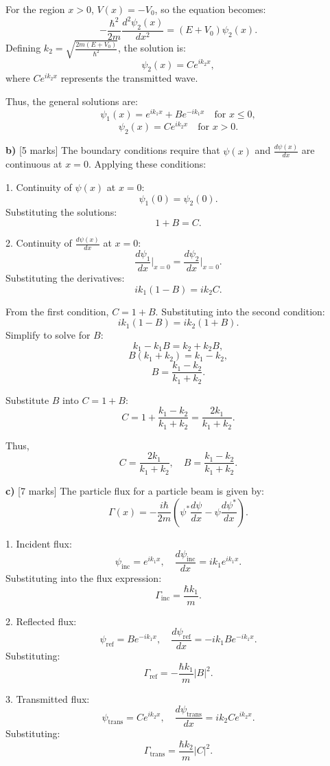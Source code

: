For the region $x > 0$, $V(x) = -V_0$, so the equation becomes:  
\[
-\frac{\hbar^2}{2m} \frac{d^2 \psi_2(x)}{dx^2} = (E + V_0)\psi_2(x).
\]  
Defining $k_2 = \sqrt{\frac{2m(E+V_0)}{\hbar^2}}$, the solution is:  
\[
\psi_2(x) = Ce^{ik_2x},
\]  
where $Ce^{ik_2x}$ represents the transmitted wave.  

Thus, the general solutions are:  
\[
\psi_1(x) = e^{ik_1x} + Be^{-ik_1x} \quad \text{for } x \leq 0,
\]  
\[
\psi_2(x) = Ce^{ik_2x} \quad \text{for } x > 0.
\]  

\textbf{b)} [5 marks]  
The boundary conditions require that $\psi(x)$ and $\frac{d\psi(x)}{dx}$ are continuous at $x = 0$. Applying these conditions:  

1. Continuity of $\psi(x)$ at $x = 0$:  
\[
\psi_1(0) = \psi_2(0).
\]  
Substituting the solutions:  
\[
1 + B = C.
\]  

2. Continuity of $\frac{d\psi(x)}{dx}$ at $x = 0$:  
\[
\frac{d\psi_1}{dx}\Big|_{x=0} = \frac{d\psi_2}{dx}\Big|_{x=0}.
\]  
Substituting the derivatives:  
\[
ik_1(1 - B) = ik_2C.
\]  

From the first condition, $C = 1 + B$. Substituting into the second condition:  
\[
ik_1(1 - B) = ik_2(1 + B).
\]  
Simplify to solve for $B$:  
\[
k_1 - k_1B = k_2 + k_2B,
\]  
\[
B(k_1 + k_2) = k_1 - k_2,
\]  
\[
B = \frac{k_1 - k_2}{k_1 + k_2}.
\]  

Substitute $B$ into $C = 1 + B$:  
\[
C = 1 + \frac{k_1 - k_2}{k_1 + k_2} = \frac{2k_1}{k_1 + k_2}.
\]  

Thus,  
\[
C = \frac{2k_1}{k_1 + k_2}, \quad B = \frac{k_1 - k_2}{k_1 + k_2}.
\]  

\textbf{c)} [7 marks]  
The particle flux for a particle beam is given by:  
\[
\Gamma(x) = -\frac{i\hbar}{2m} \left( \psi^* \frac{d\psi}{dx} - \psi \frac{d\psi^*}{dx} \right).
\]  

1. Incident flux:  
\[
\psi_\text{inc} = e^{ik_1x}, \quad \frac{d\psi_\text{inc}}{dx} = ik_1 e^{ik_1x}.
\]  
Substituting into the flux expression:  
\[
\Gamma_\text{inc} = \frac{\hbar k_1}{m}.
\]  

2. Reflected flux:  
\[
\psi_\text{ref} = Be^{-ik_1x}, \quad \frac{d\psi_\text{ref}}{dx} = -ik_1 B e^{-ik_1x}.
\]  
Substituting:  
\[
\Gamma_\text{ref} = -\frac{\hbar k_1}{m} |B|^2.
\]  

3. Transmitted flux:  
\[
\psi_\text{trans} = Ce^{ik_2x}, \quad \frac{d\psi_\text{trans}}{dx} = ik_2 C e^{ik_2x}.
\]  
Substituting:  
\[
\Gamma_\text{trans} = \frac{\hbar k_2}{m} |C|^2.
\]  

